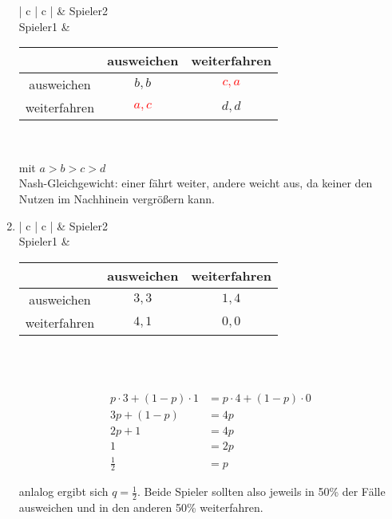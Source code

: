 \documentclass{article}
\begin{document}
\begin{enumerate}
			\begin{tabular}{| c | c |} \hline
				& Spieler2 \\ \hline
				Spieler1 & \begin{tabular}{ c | c | c} 
					& ausweichen & weiterfahren \\ \hline
					ausweichen & $b, b$ & \textcolor{red}{$c, a$}  \\ \hline
					weiterfahren & \textcolor{red}{$a, c$} & $d, d$ \\ 
				\end{tabular} \\ \hline   
			\end{tabular}
			
			mit $a > b > c > d$\\
			
			Nash-Gleichgewicht: einer fährt weiter, andere weicht aus, da keiner den Nutzen im Nachhinein vergrößern
			kann.
		\item [c)]
			\begin{tabular}{| c | c |} \hline
				& Spieler2 \\ \hline
				Spieler1 & \begin{tabular}{ c | c | c} 
					& ausweichen & weiterfahren \\ \hline
					ausweichen & $3, 3$ & $1, 4$  \\ \hline
					weiterfahren & $4, 1$ & $0, 0$ \\ 
				\end{tabular} \\ \hline   
			\end{tabular}
			\\
			\begin{align*}
			p \cdot 3 + (1 - p) \cdot 1 &= p \cdot 4 + (1 - p) \cdot 0\\
			3p + (1 - p) &= 4p\\
			2p + 1 &= 4p\\
			1 &= 2p\\
			\frac{1}{2} &= p
			\end{align*}
			
			anlalog ergibt sich $q = \frac{1}{2}$. Beide Spieler sollten also jeweils in 50\% der Fälle ausweichen und in den anderen 50\% weiterfahren.
					
		
		
	\end{enumerate}
\end{document}
